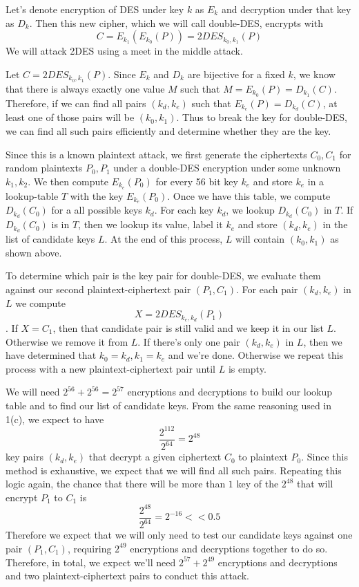Let's denote encryption of DES under key $k$ as $E_k$ and decryption under that key as
$D_k$. Then this new cipher, which we will call double-DES, encrypts with \[C =
E_{k_1}(E_{k_0}(P)) = 2DES_{k_0,k_1}(P)\] We will attack 2DES using a meet in the middle
attack. 

Let $C = 2DES_{k_0, k_1}(P)$. Since $E_k$ and $D_k$ are bijective for a fixed $k$, we know
that there is always exactly one value $M$ such that $M = E_{k_0}(P) = D_{k_1}(C)$.
Therefore, if we can find all pairs $(k_d, k_e)$ such that $E_{k_e}(P) = D_{k_d}(C)$, at
least one of those pairs will be $(k_0, k_1)$. Thus to break the key for double-DES,
we can find all such pairs efficiently and determine whether they are the key. 

Since this is a known plaintext attack, we first generate the ciphertexts $C_0, C_1$ for
random plaintexts $P_0, P_1$ under a double-DES encryption under some unknown $k_1, k_2$.
We then compute $E_{k_e}(P_0)$ for every 56 bit key $k_e$ and store $k_e$ in a lookup-table
$T$ with the key $E_{k_e}(P_0)$. Once we have this table, we compute $D_{k_d}(C_0)$ for a
all possible keys $k_d$. For each key $k_d$, we lookup $D_{k_d}(C_0)$ in $T$. If
$D_{k_d}(C_0)$ is in $T$, then we lookup its value, label it $k_e$ and store $(k_d, k_e)$
in the list of candidate keys $L$. At the end of this process, $L$ will contain $(k_0, k_1)$ as shown above.

To determine which pair is the key pair for double-DES, we evaluate them against our
second plaintext-ciphertext pair $(P_1, C_1)$. For each pair $(k_d, k_e)$ in $L$ we compute \[X =
2DES_{k_e, k_d}(P_1)\]. If $X = C_1$, then that candidate pair is still valid and we keep it in our list $L$. Otherwise we remove it from $L$. If there's only one pair $(k_d, k_e)$ in $L$, then we have determined that $k_0 = k_d, k_1 = k_e$ and we're
done. Otherwise we repeat this process with a new plaintext-ciphertext pair until $L$ is empty.

We will need $2^{56} + 2^{56} = 2^{57}$ encryptions and decryptions to build our lookup
table and to find our list of candidate keys. From the same reasoning used in 1(c), we expect to have \[\frac{2^{112}}{2^{64}} = 2^{48}\] key pairs $(k_d, k_e)$ that decrypt a given ciphertext $C_0$ to plaintext $P_0$. Since this method is exhaustive, we expect that we will find all such pairs. Repeating this logic again, the chance that there will be more than $1$ key of the $2^{48}$ that will encrypt $P_1$ to $C_1$ is \[\frac{2^{48}}{2^{64}} = 2^{-16} << 0.5\] Therefore we expect that we
will only need to test our candidate keys against one pair $(P_1, C_1)$, requiring $2^{49}$ encryptions and decryptions together to do so. Therefore, in total, we expect we'll need $2^{57} + 2^{49}$ encryptions and decryptions and two plaintext-ciphertext pairs to conduct this attack. 
